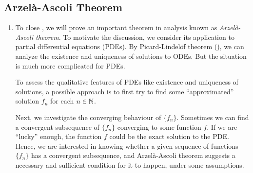 \subsection{Arzel\`a-Ascoli Theorem}
\begin{enumerate}
\item To close , we will prove an important theorem
in analysis known as \emph{Arzel\`a-Ascoli theorem}. To motivate the
discussion, we consider its application to partial differential equations
(PDEs). By Picard-Lindel\"of theorem (), we can
analyze the existence and uniqueness of solutions to ODEs.  But the situation
is much more complicated for PDEs.

To assess the qualitative features of PDEs like existence and uniqueness of
solutions, a possible approach is to first try to find some ``approximated''
solution \(f_n\) for each \(n\in\mathbb{N}\).

Next, we investigate the converging behaviour of \(\{f_n\}\). Sometimes we can
find a convergent subsequence of \(\{f_n\}\) converging to some function \(f\).
If we are ``lucky'' enough, the function \(f\) could be the exact solution to the
PDE. Hence, we are interested in knowing whether a given sequence of functions
\(\{f_n\}\) has a convergent subsequence, and Arzel\`a-Ascoli theorem suggests
a necessary and sufficient condition for it to happen, under some assumptions.


\end{enumerate}
